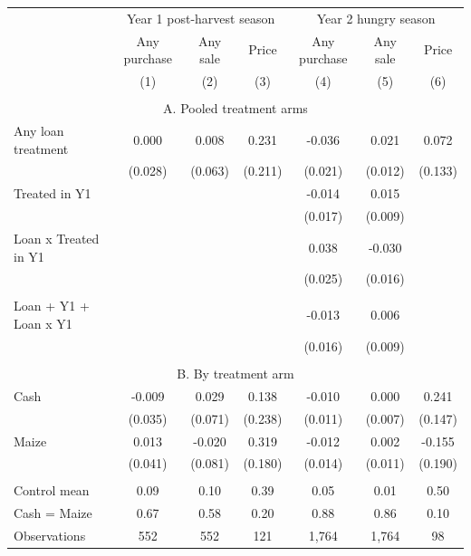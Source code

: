 \begin{tabular}{l cc c cc c}
\hline
 & \multicolumn{3}{c}{Year 1 post-harvest season} & \multicolumn{3}{c}{Year 2 hungry season} \\ 
 & Any purchase & Any sale & Price & Any purchase & Any sale & Price \\ 
 & (1) & (2) & (3) & (4) & (5) & (6) \\ 
\hline
 \\ 
\multicolumn{7}{c}{A. Pooled treatment arms} \\ 
Any loan treatment & 0.000 & 0.008 & 0.231 & -0.036 & 0.021 & 0.072 \\
 & (0.028) & (0.063) & (0.211) & (0.021) & (0.012) & (0.133) \\
Treated in Y1 &  &  &  & -0.014 & 0.015 &  \\
 &  &  &  & (0.017) & (0.009) &  \\
Loan x Treated in Y1 &  &  &  & 0.038 & -0.030 &  \\
 &  &  &  & (0.025) & (0.016) &  \\
 \\ 
Loan + Y1 + Loan x Y1 &  &  &  & -0.013 & 0.006 &  \\
 &  &  &  & (0.016) & (0.009) &  \\
 \\ 
\multicolumn{7}{c}{B. By treatment arm} \\ 
Cash & -0.009 & 0.029 & 0.138 & -0.010 & 0.000 & 0.241 \\
 & (0.035) & (0.071) & (0.238) & (0.011) & (0.007) & (0.147) \\
Maize & 0.013 & -0.020 & 0.319 & -0.012 & 0.002 & -0.155 \\
 & (0.041) & (0.081) & (0.180) & (0.014) & (0.011) & (0.190) \\
 \\ 
\hline
Control mean & 0.09 & 0.10 & 0.39 & 0.05 & 0.01 & 0.50 \\
Cash = Maize & 0.67 & 0.58 & 0.20 & 0.88 & 0.86 & 0.10 \\
Observations &       552 &       552 &       121 &     1,764 &     1,764 &        98 \\
\hline
\end{tabular}
